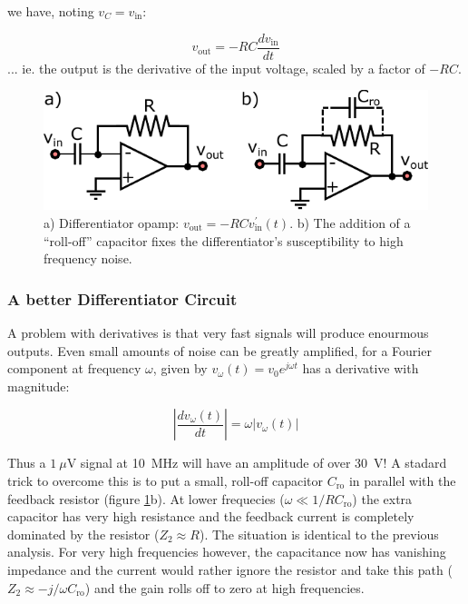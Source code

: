 \documentclass[]{article}
\begin{document}
we have, noting $v_C = v_\text{in}$:

\begin{equation}
\label{eq:opamp_differentiator}
v_\text{out} = -RC\frac{dv_\text{in}}{dt}
\end{equation}
\noindent ... ie. the output is the derivative of the input voltage, scaled by a factor of $-RC$.

\begin{figure}[ht]
\caption{a) Differentiator opamp: $v_\text{out} = -RCv_\text{in}^\prime(t)$. b) The addition of a ``roll-off'' capacitor fixes the differentiator's susceptibility to high frequency noise.}
\label{fig:differentiator_opamp}
	\begin{center}
		\includegraphics[]{Images/differentiator_opamp.pdf}
	\end{center}
\end{figure}
\subsubsection{A better Differentiator Circuit}
A problem with derivatives is that very fast signals will produce enourmous outputs. Even small amounts of noise can be greatly amplified, for a Fourier component at frequency $\omega$, given by $v_\omega(t) = v_0e^{j\omega t}$ has a derivative with magnitude:

$$
\left\vert\frac{dv_\omega(t)}{dt}\right\vert = \omega \vert v_\omega(t)\vert
$$

Thus a $1~\mu$V signal at 10~MHz will have an amplitude of over 30~V! A stadard trick to overcome this is to put a small, roll-off capacitor $C_\text{ro}$ in parallel with the feedback resistor (figure \ref{fig:differentiator_opamp}b). At lower frequecies ($\omega \ll 1/RC_\text{ro}$) the extra capacitor has very high resistance and the feedback current is completely dominated by the resistor ($Z_2 \approx R$). The situation is identical to the previous analysis. For very high frequencies however, the capacitance now has vanishing impedance and the current would rather ignore the resistor and take this path ($Z_2\approx -j/\omega C_\text{ro}$) and the gain rolls off to zero at high frequencies.
\end{document}
